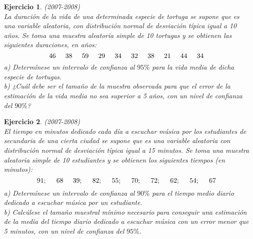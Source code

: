 \documentclass[12pt, a4paper]{amsart}
\newtheorem{ejer}{Ejercicio}
\begin{document}
\begin{ejer}\em (2007-2008)\\
La duración de la vida de una determinada especie de tortuga se supone que es una variable
aleatoria, con distribución normal de desviación típica igual a 10 años. Se toma una muestra
aleatoria simple de 10 tortugas y se obtienen las siguientes duraciones, en años:
\[46\hspace*{5mm} 38\hspace*{5mm} 59\hspace*{5mm} 29\hspace*{5mm} 34\hspace*{5mm} 32\hspace*{5mm} 38\hspace*{5mm} 21\hspace*{5mm} 44\hspace*{5mm} 34\]
a) Determínese un intervalo de confianza al $95\%$ para la vida media de dicha especie de tortugas.\\
b) ¿Cuál debe ser el tamaño de la muestra observada para que el error de la estimación de la
vida media no sea superior a 5 años, con un nivel de confianza del $90\%$?
\end{ejer}

\begin{ejer}\em (2007-2008)\\
El tiempo en minutos dedicado cada día a escuchar música por los estudiantes de secundaria de
una cierta ciudad se supone que es una variable aleatoria con distribución normal de desviación
típica igual a 15 minutos. Se toma una muestra aleatoria simple de 10 estudiantes y se obtienen
los siguientes tiempos (en minutos):
\[91;\hspace*{5mm} 68\hspace*{5mm} 39;\hspace*{5mm} 82;\hspace*{5mm} 55;\hspace*{5mm} 70;\hspace*{5mm} 72;\hspace*{5mm} 62;\hspace*{5mm} 54;\hspace*{5mm} 67\]
a) Determínese un intervalo de confianza al $90\%$ para el tiempo medio diario dedicado a escuchar
música por un estudiante.\\
b) Calcúlese el tamaño muestral mínimo necesario para conseguir una estimación de la media
del tiempo diario dedicado a escuchar música con un error menor que 5 minutos, con un nivel
de confianza del $95\%$.
\end{ejer}
\end{document}
